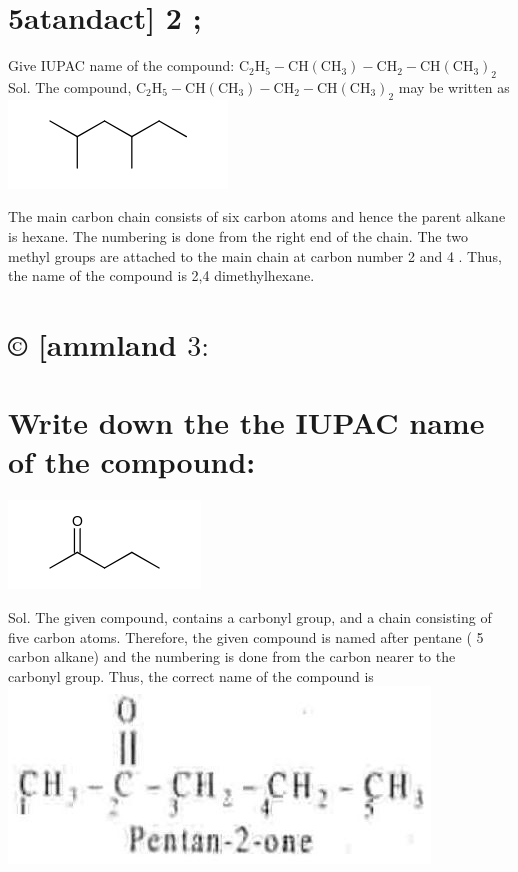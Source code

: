 \documentclass[10pt]{article}
\begin{document}
\section*{5atandact] 2 ;}
Give IUPAC name of the compound: $\mathrm{C}_{2} \mathrm{H}_{5}-\mathrm{CH}\left(\mathrm{CH}_{3}\right)-\mathrm{CH}_{2}-\mathrm{CH}\left(\mathrm{CH}_{3}\right)_{2}$\\
Sol. The compound, $\mathrm{C}_{2} \mathrm{H}_{5}-\mathrm{CH}\left(\mathrm{CH}_{3}\right)-\mathrm{CH}_{2}-\mathrm{CH}\left(\mathrm{CH}_{3}\right)_{2}$ may be written as\\
\includegraphics{smile-83663405b780d12d065b9890d8621ed77dd375a5}

The main carbon chain consists of six carbon atoms and hence the parent alkane is hexane. The numbering is done from the right end of the chain. The two methyl groups are attached to the main chain at carbon number 2 and 4 . Thus, the name of the compound is 2,4 dimethylhexane.

\section*{© [ammland $3:$}
\section*{Write down the the IUPAC name of the compound:}
\includegraphics{smile-ef1ad80441dec59639cddbcf0ff8af30f024845e}

Sol. The given compound, contains a carbonyl group, and a chain consisting of five carbon atoms. Therefore, the given compound is named after pentane ( 5 carbon alkane) and the numbering is done from the carbon nearer to the carbonyl group. Thus, the correct name of the compound is\\
\includegraphics[max width=\textwidth, center]{2025_01_28_8470952b98110cec3aabg-036}
\end{document}
